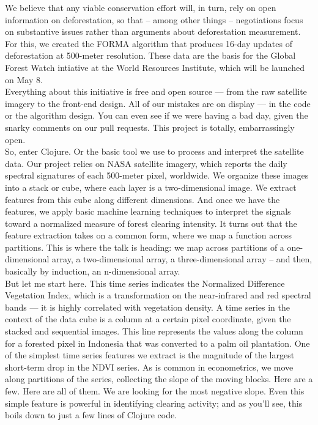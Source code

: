 \documentclass{article}
\begin{document}
We believe that any viable conservation effort will, in turn, rely on
open information on deforestation, so that -- among other things --
negotiations focus on substantive issues rather than arguments about
deforestation measurement.  \\

For this, we created the FORMA algorithm that produces 16-day updates
of deforestation at 500-meter resolution.  These data are the basis
for the Global Forest Watch intiative at the World Resources
Institute, which will be launched on May 8.  \\

Everything about this initiative is free and open source --- from the
raw satellite imagery to the front-end design.  All of our mistakes
are on display --- in the code or the algorithm design.  You can
even see if we were having a bad day, given the snarky comments on our
pull requests.  This project is totally, embarrassingly open.\\

So, enter Clojure.  Or the basic tool we use to process and interpret
the satellite data.  Our project relies on NASA satellite imagery,
which reports the daily spectral signatures of each 500-meter pixel,
worldwide.  We organize these images into a stack or cube, where each
layer is a two-dimensional image.  We extract features from this cube
along different dimensions.  And once we have the features, we apply
basic machine learning techniques to interpret the signals toward a
normalized measure of forest clearing intensity.  It turns out that
the feature extraction takes on a common form, where we map a function
across partitions.  This is where the talk is heading: we map across
partitions of a one-dimensional array, a two-dimensional array, a
three-dimensional array -- and then, basically by induction, an
n-dimensional array.\\

But let me start here.  This time series indicates the Normalized
Difference Vegetation Index, which is a transformation on the
near-infrared and red spectral bands --- it is highly correlated with
vegetation density.  A time series in the context of the data cube is
a column at a certain pixel coordinate, given the stacked and
sequential images.  This line represents the values along the column
for a forested pixel in Indonesia that was converted to a palm oil
plantation.  One of the simplest time series features we extract is
the magnitude of the largest short-term drop in the NDVI series.  As
is common in econometrics, we move along partitions of the series,
collecting the slope of the moving blocks.  Here are a few. Here are
all of them. We are looking for the most negative slope.  Even this
simple feature is powerful in identifying clearing activity; and as
you'll see, this boils down to just a few lines of Clojure code.\\
\end{document}
